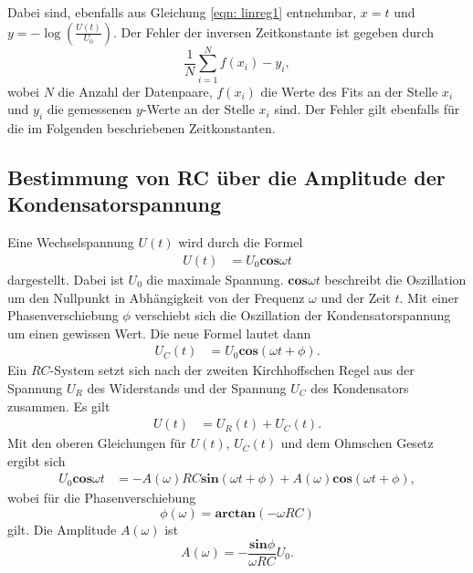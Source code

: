Dabei sind, ebenfalls aus Gleichung \eqref{eqn: linreg1} entnehmbar, $x=t$ und $y=-\log(\frac{U(t)}{U_{0}})$. %
Der Fehler der inversen Zeitkonstante ist gegeben durch
\begin{equation}
    \frac{1}{N} \sum_{i=1}^N f(x_{i}) - y_{i},
    \label{eqn: fehler}
\end{equation}
wobei $N$ die Anzahl der Datenpaare, 
$f(x_{i})$ die Werte des Fits an der Stelle $x_{i}$
und $y_{i}$ die gemessenen $y$-Werte an der Stelle $x_{i}$ sind.
Der Fehler gilt ebenfalls für die im Folgenden beschriebenen Zeitkonstanten.

\subsection{Bestimmung von RC über die Amplitude der Kondensatorspannung}
Eine Wechselspannung $U(t)$ wird durch die Formel 
\begin{align*} 
    U(t)&= U_{0} \mathbf{cos}\omega t 
\end{align*}
dargestellt. Dabei ist $U_{0}$ die maximale Spannung. $\mathbf{cos}\omega t$ beschreibt die Oszillation um den Nullpunkt in Abhängigkeit von der Frequenz $\omega$ und der Zeit $t$. 
Mit einer Phasenverschiebung $\phi$ verschiebt sich die Oszillation der Kondensatorspannung um einen gewissen Wert. Die neue Formel lautet dann 
\begin{align*} 
    U_{C}(t)&= U_{0} \mathbf{cos}(\omega t + \phi).
\end{align*}
Ein $RC$-System setzt sich nach der zweiten Kirchhoffschen Regel aus der Spannung $U_{R}$ des Widerstands und der Spannung $U_{C}$ des Kondensators zusammen.
Es gilt 
\begin{align*} 
    U(t) &= U_{R}(t) + U_{C}(t).
\end{align*}
Mit den oberen Gleichungen für $U(t)$, $U_{C}(t)$ und dem Ohmschen Gesetz ergibt sich 
\begin{align*} 
U_{0} \mathbf{cos}\omega t &= -A(\omega) RC \mathbf{sin}(\omega t + \phi) + A(\omega) \mathbf{cos}(\omega t + \phi),  
\end{align*}
wobei für die Phasenverschiebung 
\begin{equation} 
\phi (\omega) = \mathbf{arctan}(-\omega RC) 
\label{eqn: phi}
\end{equation}
gilt. Die Amplitude $A(\omega)$ ist
\begin{equation} 
    A(\omega) = - \frac{\mathbf{sin}\phi}{\omega RC} U_{0}.
    \label{eqn: A1}
\end{equation}
